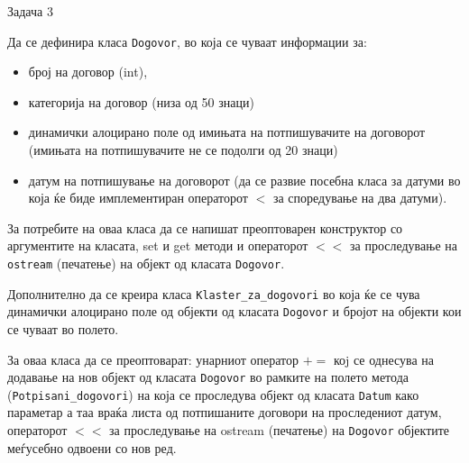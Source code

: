 \begin{frame}{Задача 3}
\begin{scriptsize}
 Да се дефинира класа \texttt{Dogovor}, во која се чуваат информации за:
 \begin{itemize}
   \item број на договор (int),
   \item категорија на договор (низа од 50 знаци)
   \item динамички алоцирано поле од имињата на потпишувачите на договорот
   (имињата на потпишувачите не се подолги од 20 знаци)
   \item датум на потпишување на договорот (да се развие посебна класа за датуми
   во која ќе биде имплементиран операторот $<$ за споредување на два датуми).
 \end{itemize}
За потребите на оваа класа да се напишат преоптоварен конструктор со аргументите
на класата, set и get методи и операторот $<<$ за проследување на \texttt{ostream}
(печатење) на објект од класата \texttt{Dogovor}.

Дополнително да се креира класа \texttt{Klaster\_za\_dogovori} во која ќе се
чува динамички алоцирано поле од објекти од класата \texttt{Dogovor} и бројот на
објекти кои се чуваат во полето. 

За оваа класа да се преоптоварат: унарниот оператор $+=$ коj се однесува на
додавање на нов објект од класата \texttt{Dogovor} во рамките на полето
метода (\texttt{Potpisani\_dogovori}) на која се проследува објект од класата
\texttt{Datum} како параметар а таа враќа листа од потпишаните договори на проследениот
датум, операторот $<<$ за проследување на ostream (печатење) на \texttt{Dogovor}
објектите меѓусебно одвоени со нов ред.

\end{scriptsize}
\end{frame}

